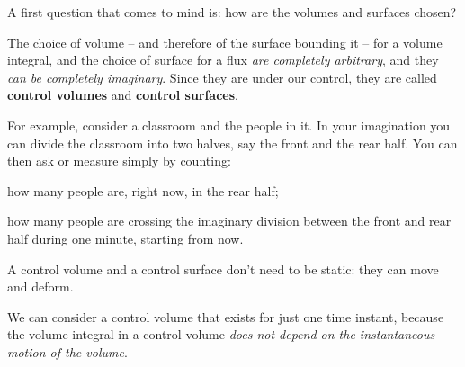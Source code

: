 \documentclass[a4paper,12pt,%
onecolumn,oneside,titlepage,%
british%
]{memoir}
\renewcommand*{\|}[1][]{\nonscript\:#1\vert\nonscript\:\mathopen{}}
\begin{document}
A first question that comes to mind is: how are the volumes and surfaces chosen?

The choice of volume -- and therefore of the surface bounding it -- for a volume integral, and the choice of surface for a flux \emph{are completely arbitrary}, and they \emph{can be completely imaginary}. Since they are under our control, they are called \textbf{control volumes} and \textbf{control surfaces}.

For example, consider a classroom and the people in it. In your imagination you can divide the classroom into two halves, say the front and the rear half. You can then ask or measure simply by counting:\enspace
\begin{enumerate*}[label=\arabic*.]
\item how many people are, right now, in the rear half;\enspace
\item how many people are crossing the imaginary division between the front and rear half during one minute, starting from now.
\end{enumerate*}


A control volume and a control surface don't need to be static: they can move and deform.

We can consider a control volume that exists for just one time instant, because the volume integral in a control volume \emph{does not depend on the instantaneous motion of the volume}.
\end{document}
